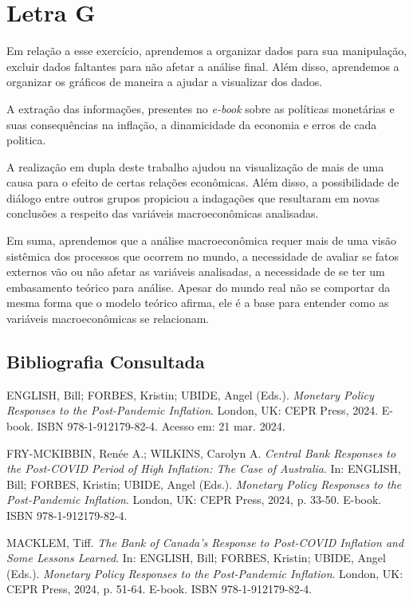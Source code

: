 \documentclass[a4paper,12pt]{article}[abntex2]
\begin{document}
\section{\textbf{Letra G}}
Em relação a esse exercício, aprendemos a organizar dados para sua manipulação, excluir dados faltantes para não afetar a análise final. Além disso, aprendemos a organizar os gráficos de maneira a ajudar a visualizar dos dados. 

A extração das informações, presentes no \textit{e-book} sobre as políticas monetárias e suas consequências na inflação, a dinamicidade da economia e erros de cada politica. 

A realização em dupla deste trabalho ajudou na visualização de mais de uma causa para o efeito de certas relações econômicas. Além disso, a possibilidade de diálogo entre outros grupos propiciou a indagações que resultaram em novas conclusões a respeito das variáveis macroeconômicas analisadas.

Em suma, aprendemos que a análise macroeconômica requer mais de uma visão sistêmica dos processos que ocorrem no mundo, a necessidade de avaliar se fatos externos vão ou não afetar as variáveis analisadas, a necessidade de se ter um embasamento teórico para análise. Apesar do mundo real não se comportar da mesma forma que o modelo teórico afirma, ele é a base para entender como as variáveis macroeconômicas se relacionam.

\newpage
\begin{thebibliography}{9}
\section*{Bibliografia Consultada}
ENGLISH, Bill; FORBES, Kristin; UBIDE, Angel (Eds.). 
\textit{Monetary Policy Responses to the Post-Pandemic Inflation}. 
London, UK: CEPR Press, 2024. E-book. ISBN 978-1-912179-82-4.  
Acesso em: 21 mar. 2024.

FRY-MCKIBBIN, Renée A.; WILKINS, Carolyn A. 
\textit{Central Bank Responses to the Post-COVID Period of High Inflation: The Case of Australia}. In: ENGLISH, Bill; FORBES, Kristin; UBIDE, Angel (Eds.). 
\textit{Monetary Policy Responses to the Post-Pandemic Inflation}. 
London, UK: CEPR Press, 2024, p. 33-50. E-book. ISBN 978-1-912179-82-4.

MACKLEM, Tiff. 
\textit{The Bank of Canada’s Response to Post-COVID Inflation and Some Lessons Learned}. In: ENGLISH, Bill; FORBES, Kristin; UBIDE, Angel (Eds.). 
\textit{Monetary Policy Responses to the Post-Pandemic Inflation}. 
London, UK: CEPR Press, 2024, p. 51-64. E-book. ISBN 978-1-912179-82-4.
\end{thebibliography}
\end{document}
